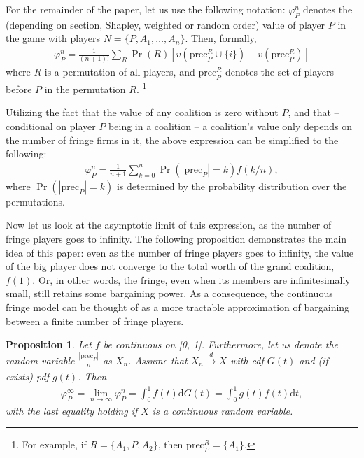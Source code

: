 \documentclass[a4paper]{article}
\newtheorem{proposition}{Proposition}
\newcommand{\dt}{\mathrm{d}t}
\newcommand{\dG}{\mathrm{d}G}
\newcommand{\precede}{\mathrm{prec}}
\begin{document}
For the remainder of the paper, let us use the following notation: $\varphi_P^n$ denotes the (depending on section, Shapley, weighted or random order) value of player $P$ in the game with players $N = \{P, A_1, \dots, A_n\}$.
Then, formally,
\begin{align}
    \varphi_P^n = \frac{1}{(n+1)!} \sum_{R} \Pr(R) [ v(\precede_P^R \cup \{i\}) - v(\precede_P^R) ]  \label{eq:one_sided_general}
\end{align}
where $R$ is a permutation of all players, and $\precede_P^R$ denotes the set of players before $P$ in the permutation $R$. \footnote{
    For example, if $R = \{A_1, P, A_2\}$, then $\precede_P^R = \{A_1\}$.
}

Utilizing the fact that the value of any coalition is zero without $P$, and that -- conditional on player $P$ being in a coalition -- a coalition's value only depends on the number of fringe firms in it, the above expression can be simplified to the following:
\begin{align*}
    \varphi_P^n = \frac{1}{n+1} \sum_{k=0}^n \Pr(|\precede_P| = k) f(k/n),
\end{align*}
where $\Pr(|\precede_P| = k)$ is determined by the probability distribution over the permutations.

Now let us look at the asymptotic limit of this expression, as the number of fringe players goes to infinity.
The following proposition demonstrates the main idea of this paper: even as the number of fringe players goes to infinity, the value of the big player does not converge to the total worth of the grand coalition, $f(1)$.
Or, in other words, the fringe, even when its members are infinitesimally small, still retains some bargaining power.
As a consequence, the continuous fringe model can be thought of as a more tractable approximation of bargaining between a finite number of fringe players.

\begin{proposition}
    \label{prop:one_sided_general}
    Let $f$ be continuous on [0, 1]. Furthermore, let us denote the random variable $\frac{|\precede_P|}{n}$ as $X_n$. Assume that $X_n \xrightarrow[]{d} X$ with cdf $G(t)$ and (if exists) pdf $g(t)$.
    Then
    \begin{align*}
        \varphi_P^\infty = \lim_{n \to \infty} \varphi_P^n = \int_0^1 f(t) \dG(t) = \int_0^1 g(t) f(t) \dt,
    \end{align*}
    with the last equality holding if $X$ is a continuous random variable.
\end{proposition}
\end{document}
